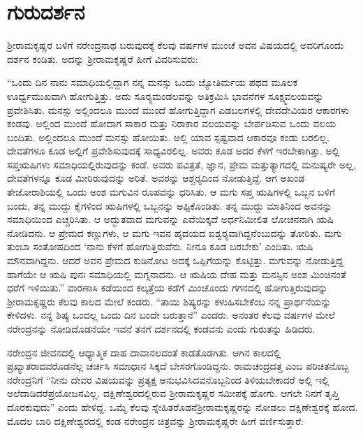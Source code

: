 
\chapter{ಗುರುದರ್ಶನ}

\vskip -10pt

ಶ‍್ರೀರಾಮಕೃಷ್ಣರ ಬಳಿಗೆ ನರೇಂದ್ರನಾಥ ಬರುವುದಕ್ಕೆ ಕೆಲವು ವರ್ಷಗಳ ಮುಂಚೆ ಅವನ ವಿಷಯದಲ್ಲಿ ಅವರಿಗೊಂದು ದರ್ಶನ ಕಂಡಿತು. ಅದನ್ನು ಶ‍್ರೀರಾಮಕೃಷ್ಣರೆ ಹೀಗೆ ವಿವರಿಸುವರು:

“ಒಂದು ದಿನ ನಾನು ಸಮಾಧಿಯಲ್ಲಿದ್ದಾಗ ನನ್ನ ಮನಸ್ಸು ಒಂದು ಜ್ಯೋತಿರ್ಮಯ ಪಥದ ಮೂಲಕ ಊರ್ಧ್ವಮುಖವಾಗಿ ಹೋಗುತ್ತಿತ್ತು. ಅದು ಸೂರ‍್ಯಮಂಡಲವನ್ನು ಅತಿಕ್ರಮಿಸಿ ಭಾವನೆಗಳ ಸೂಕ್ಷ್ಮವಲಯವನ್ನು ಪ್ರವೇಶಿಸಿತು. ಮನಸ್ಸು ಅಲ್ಲಿಂದಲೂ ಮುಂದೆ ಮುಂದೆ ಹೋಗುತ್ತಿದ್ದಾಗ ಎಡಬಲಗಳಲ್ಲಿ ದೇವದೇವಿಯರ ಆಕಾರಗಳು ಕಂಡವು. ಅಲ್ಲಿಂದ ಮುಂದೆ ಹೋದಾಗ ಸಾಕಾರ ಮತ್ತು ನಿರಾಕಾರ ವಲಯವನ್ನು ಬೇರ್ಪಡಿಸುವ ಒಂದು ವಲಯ ಬಂದಿತು. ಅಲ್ಲಿಂದಲೂ ಮುಂದೆ ಮನಸ್ಸು ಹೋಯಿತು. ಅಲ್ಲಿ ಯಾವ ಸ್ಪಷ್ಟವಾದ ಆಕಾರವೂ ಕಂಡು ಬರಲಿಲ್ಲ. ದೇವತೆಗಳೂ ಕೂಡ ಅಲ್ಲಿಗೆ ಪ್ರವೇಶಿಸುವುದಕ್ಕೆ ಸಾಧ್ಯವಿರಲಿಲ್ಲ. ಅವರು ಕೂಡ ಅದರ ಕೆಳಗೆ ಇರಬೇಕಾಗಿತ್ತು. ಅಲ್ಲಿ ಸಪ್ತಋಷಿಗಳು ಸಮಾಧಿಯಲ್ಲಿರುವುದನ್ನು ಕಂಡೆ. ಅವರು ಪವಿತ್ರತೆ, ಜ್ಞಾನ, ಪ್ರೇಮ ಮತ್ತು\break ತ್ಯಾಗದಲ್ಲಿ ಮನುಷ್ಯರೇ ಅಲ್ಲ, ದೇವತೆಗಳನ್ನೂ ಕೂಡ ಮೀರಿರುವುದನ್ನು ಅರಿತೆ. ಅವರನ್ನು ಆಶ್ಚರ‍್ಯದಿಂದ ನೋಡುತ್ತಿದ್ದೆ. ಆಗ ಅಖಂಡ ತೇಜೋರಾಶಿಯಲ್ಲಿ ಒಂದು ಅಂಶ ಮಗುವಿನ ರೂಪವನ್ನು ಧರಿಸಿತು. ಆ ಮಗು ಸಪ್ತ ಋಷಿಗಳಲ್ಲಿ ಒಬ್ಬನ ಬಳಿಗೆ ಬಂದು, ತನ್ನ ಮುದ್ದು ಕೈಗಳಿಂದ ಋಷಿಗಳಲ್ಲಿ ಒಬ್ಬನನ್ನು ಅಪ್ಪಿಕೊಂಡಿತು. ತನ್ನ ಮುದ್ದು ಮಾತಿನಿಂದ ಅವನನ್ನು ಸಮಾಧಿಯಿಂದ ಎಚ್ಚರಿಸಿತು. ಆ ಅದ್ಭುತವಾದ ಮಗುವನ್ನು ಎವೆಯಿಕ್ಕದೆ ಅರ್ಧನಿಮೀಲಿತ ಲೋಚನನಾಗಿ ಋಷಿ ನೋಡಿದನು. ಆ ಪ್ರೇಮದ ಕಣ್ಣುಗಳು, ಆ ಮಗು ಇವನ ಹೃದಯದ ಐಶ್ವರ‍್ಯವಾಗಿದ್ದನೆಂಬುದನ್ನು ತೋರಿತು. ಮಗು ತುಂಬಾ ಸಂತೋಷದಿಂದ ‘ನಾನು ಕೆಳಗೆ ಹೋಗುತ್ತಿರುವೆನು. ನೀನೂ ಕೂಡ ಬರಬೇಕು’ ಎಂದಿತು. ಋಷಿ ಮೌನವಾಗಿದ್ದನು. ಆದರೆ ಅವನ ಪ್ರೇಮದ ಕುಡಿನೋಟ ಅದಕ್ಕೆ ಒಪ್ಪಿಗೆಯನ್ನು ಕೊಟ್ಟಿತ್ತು. ಮಗುವನ್ನು ನೋಡುತ್ತಿದ್ದ ಹಾಗೆಯೇ ಆ ಋಷಿ ಪುನಃ ಸಮಾಧಿಯಲ್ಲಿ ಮಗ್ನನಾದನು. ಆ ಋಷಿಯ ದೇಹ ಮತ್ತು ಮನಸ್ಸಿನ ಅಂಶ ಮಿಂಚಿನಂತೆ ಧರೆಗೆ ಇಳಿಯಿತು.” ವಾರಣಾಸಿ ಕಡೆಯಿಂದ ಕಲ್ಕತ್ತೆಯ ಕಡೆಗೆ ಮಿಂಚೊಂದು ಗಗನದಲ್ಲಿ ಹೋಗುತ್ತಿರುವುದನ್ನು ಶ‍್ರೀರಾಮಕೃಷ್ಣರು ಕೆಲವು ಕಾಲದ ಮೇಲೆ ಕಂಡರು. “ತಾಯಿ ಶಿಷ್ಯರನ್ನು ಕಳುಹಿಸಬೇಕೆಂಬ ನನ್ನ ಪ್ರಾರ್ಥನೆಯನ್ನು ಕೇಳಿದಳು. ನನ್ನ ಶಿಷ್ಯ ಒಂದಲ್ಲ ಒಂದು ದಿನ ಬಂದೇ ಬರುತ್ತಾನೆ” ಎಂದರು. ಅನಂತರ ಕೆಲವು ವರ್ಷಗಳ ಮೇಲೆ ನರೇಂದ್ರನನ್ನು ನೋಡಿದೊಡನೆಯೇ ಇವನೆ ತನಗೆ ದರ್ಶನದಲ್ಲಿ ಕಂಡವನು ಎಂದು ಗುರುತನ್ನು ಹಿಡಿದರು.

ನರೇಂದ್ರನ ಜೀವನದಲ್ಲಿ ಆಧ್ಯಾತ್ಮಿಕ ದಾಹ ದಾವಾನಲದಂತೆ ಕಾಡತೊಡಗಿತು. ಆಗಿನ ಕಾಲದಲ್ಲಿ ಪ್ರಖ್ಯಾತರಾದವರೊಡನೆಲ್ಲ ಚರ್ಚಿಸಿ ಸಮಾಧಾನ ಸಿಕ್ಕದೆ ಬೇಸರಗೊಂಡಿದ್ದನು. ರಾಮಚಂದ್ರದತ್ತ ಎಂಬ ಪರಿಚಿತನೊಬ್ಬ ನರೇಂದ್ರನಿಗೆ “ನೀನು ದೇವರ ವಿಷಯವನ್ನು ಪ್ರತ್ಯಕ್ಷ ಅನುಭವಿಸಿದವನೊಬ್ಬನಿಂದ ತಿಳಿಯಬೇಕಾದರೆ ಅಲ್ಲಿ ಇಲ್ಲಿ ಅಲೆದಾಡಿದರೆ\break ಪ್ರಯೋಜನವಿಲ್ಲ. ದಕ್ಷಿಣೇಶ್ವರದಲ್ಲಿರುವ ಶ‍್ರೀರಾಮಕೃಷ್ಣರ ಸಮೀಪಕ್ಕೆ ಹೋಗು. ಆಗಲೇ ನಿನಗೆ ತೃಪ್ತಿ ದೊರಕುವುದು” ಎಂದು ಹೇಳಿದ್ದ. ಒಮ್ಮೆ ಕೆಲವು ಸ್ನೇಹಿತರೊಡನೆ\break ಶ‍್ರೀರಾಮಕೃಷ್ಣರನ್ನು ನೋಡಲು ದಕ್ಷಿಣೇಶ್ವರಕ್ಕೆ ಹೋದ. ಮೊದಲ ಬಾರಿ ದಕ್ಷಿಣೇಶ್ವರದಲ್ಲಿ ಕಂಡ ನರೇಂದ್ರನ ಚಿತ್ರವನ್ನು ಶ‍್ರೀರಾಮಕೃಷ್ಣರೇ ಹೀಗೆ ವರ್ಣಿಸುತ್ತಾರೆ:

